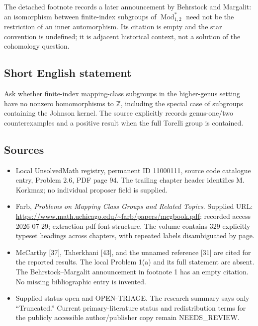 \documentclass[11pt]{article}
\newcommand{\Z}{\mathbb{Z}}
\begin{document}
The detached footnote records a later announcement by Behrstock and Margalit: an isomorphism between finite-index subgroups of \(\operatorname{Mod}_{1,2}^*\) need not be the restriction of an inner automorphism. Its citation is empty and the star convention is undefined; it is adjacent historical context, not a solution of the cohomology question.
\subsection{Short English statement}
Ask whether finite-index mapping-class subgroups in the higher-genus setting have no nonzero homomorphisms to \(\Z\), including the special case of subgroups containing the Johnson kernel. The source explicitly records genus-one/two counterexamples and a positive result when the full Torelli group is contained.
\subsection{Sources}
\begin{itemize}
\item Local UnsolvedMath registry, permanent ID 11000111, source code catalogue entry, Problem 2.6, PDF page 94. The trailing chapter header identifies M. Korkmaz; no individual proposer field is supplied.
\item Farb, \emph{Problems on Mapping Class Groups and Related Topics}. Supplied URL: \url{https://www.math.uchicago.edu/~farb/papers/mcgbook.pdf}; recorded access 2026-07-29; extraction pdf-font-structure. The volume contains 329 explicitly typeset headings across chapters, with repeated labels disambiguated by page.
\item McCarthy [37], Taherkhani [43], and the unnamed reference [31] are cited for the reported results. The local Problem 1(a) and its full statement are absent. The Behrstock--Margalit announcement in footnote 1 has an empty citation. No missing bibliographic entry is invented.
\item Supplied status open and OPEN-TRIAGE. The research summary says only ``Truncated.'' Current primary-literature status and redistribution terms for the publicly accessible author/publisher copy remain NEEDS\_REVIEW.
\end{itemize}
\end{document}
